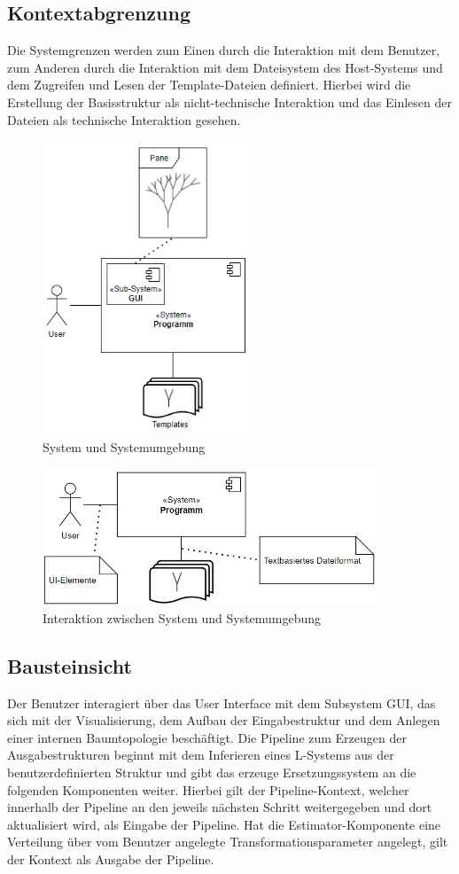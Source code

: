 \newpage

\subsection*{Kontextabgrenzung}
Die Systemgrenzen werden zum Einen durch die Interaktion mit dem Benutzer, zum Anderen durch die Interaktion mit
dem Dateisystem des Host-Systems und dem Zugreifen und Lesen der Template-Dateien definiert.
Hierbei wird die Erstellung der Basisstruktur als nicht-technische Interaktion und das Einlesen der Dateien als
technische Interaktion gesehen.
\begin{figure}[H]
    \centering
    \includegraphics[width=6.2cm]{../images/Fachlicher_Kontext.PNG}
    \caption{System und Systemumgebung}
\end{figure}
\begin{figure}[H]
    \centering
    \includegraphics[width=10cm]{../images/Technischer_Kontext.PNG}
    \caption{Interaktion zwischen System und Systemumgebung}
\end{figure}

\subsection*{Bausteinsicht}
Der Benutzer interagiert über das User Interface mit dem Subsystem GUI, das sich mit der Visualisierung, dem Aufbau der
Eingabestruktur und dem Anlegen einer internen Baumtopologie beschäftigt.
Die Pipeline zum Erzeugen der Ausgabestrukturen beginnt mit dem Inferieren eines L-Systems aus der benutzerdefinierten
Struktur und gibt das erzeuge Ersetzungssystem an die folgenden Komponenten weiter.
Hierbei gilt der Pipeline-Kontext, welcher innerhalb der Pipeline an den jeweils nächsten Schritt weitergegeben und
dort aktualisiert wird, als Eingabe der Pipeline.
Hat die Estimator-Komponente eine Verteilung über vom Benutzer angelegte Transformationsparameter angelegt, gilt
der Kontext als Ausgabe der Pipeline.

